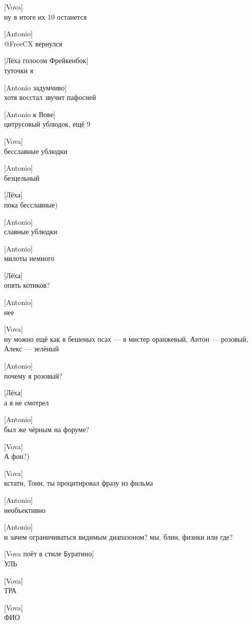 [Vova]\\
ну в итоге их 10 останется


[Antonio]\\
@FreeCX вернулся


[Лёха голосом Фрейкенбок]\\
туточки я


[Antonio задумчиво]\\
хотя восстал звучит пафосней


[Antonio к Вове]\\
цитрусовый ублюдок, ещё 9


[Vova]\\
бесславные ублюдки


[Antonio]\\
безцельный


[Лёха]\\
пока бесславные)


[Antonio]\\
славные ублюдки


[Antonio]\\
милоты немного


[Лёха]\\
опять котиков?


[Antonio]\\
нее


[Vova]\\
ну можно ещё как в бешеных псах — я мистер оранжевый, Антон — розовый, Алекс — зелёный


[Antonio]\\
почему я розовый?


[Лёха]\\
а я не смотрел


[Antonio]\\
был же чёрным на форуме?


[Vova]\\
А фон?)


[Vova]\\
кстати, Тони, ты процитировал фразу из фильма


[Antonio]\\
необъективно


[Antonio]\\
и зачем ограничиваться видимым диапазоном? мы, блин, физики или где?


[Vova поёт в стиле Буратино]\\
УЛЬ


[Vova]\\
ТРА


[Vova]\\
ФИО


